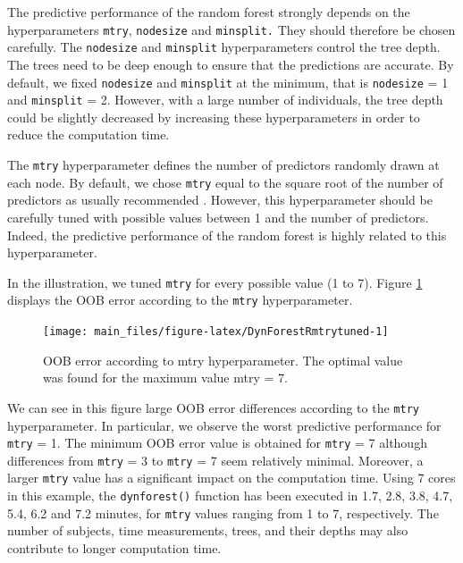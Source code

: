 The predictive performance of the random forest strongly depends on the hyperparameters \texttt{mtry}, \texttt{nodesize} and \texttt{minsplit.} They should therefore be chosen carefully. The \texttt{nodesize} and \texttt{minsplit} hyperparameters control the tree depth. The trees need to be deep enough to ensure that the predictions are accurate. By default, we fixed \texttt{nodesize} and \texttt{minsplit} at the minimum, that is \texttt{nodesize} = 1 and \texttt{minsplit} = 2. However, with a large number of individuals, the tree depth could be slightly decreased by increasing these hyperparameters in order to reduce the computation time.

The \texttt{mtry} hyperparameter defines the number of predictors randomly drawn at each node. By default, we chose \texttt{mtry} equal to the square root of the number of predictors as usually recommended \citep{bernard_influence_2009}. However, this hyperparameter should be carefully tuned with possible values between 1 and the number of predictors. Indeed, the predictive performance of the random forest is highly related to this hyperparameter.

In the illustration, we tuned \texttt{mtry} for every possible value (1 to 7). Figure \ref{fig:DynForestRmtrytuned} displays the OOB error according to the \texttt{mtry} hyperparameter.

\begin{figure}

{\centering \texttt{[image: main\_files/figure-latex/DynForestRmtrytuned-1]} 

}

\caption{OOB error according to mtry hyperparameter. The optimal value was found for the maximum value mtry = 7.}\label{fig:DynForestRmtrytuned}
\end{figure}

We can see in this figure large OOB error differences according to the \texttt{mtry} hyperparameter. In particular, we observe the worst predictive performance for \texttt{mtry} = 1. The minimum OOB error value is obtained for \texttt{mtry} = 7 although differences from \texttt{mtry} = 3 to \texttt{mtry} = 7 seem relatively minimal. Moreover, a larger \texttt{mtry} value has a significant impact on the computation time. Using 7 cores in this example, the \texttt{dynforest()} function has been executed in 1.7, 2.8, 3.8, 4.7, 5.4, 6.2 and 7.2 minutes, for \texttt{mtry} values ranging from 1 to 7, respectively. The number of subjects, time measurements, trees, and their depths may also contribute to longer computation time.

